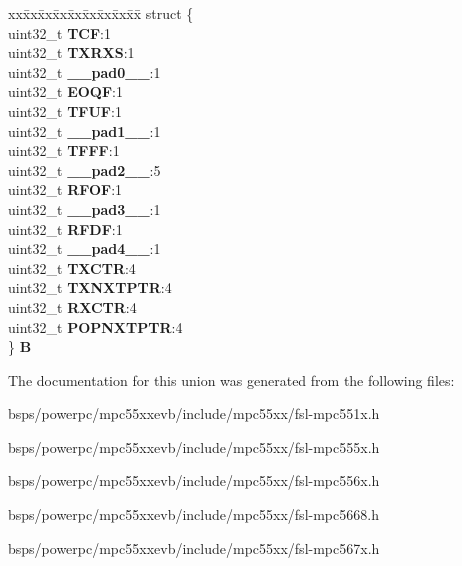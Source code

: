\begin{DoxyCompactItemize}
\begin{tabbing}
\end{tabbing}\item 
\mbox{\label{unionDSPI__tag_1_1DSPI__SR__tag_a37281b968030370262e6158b3253c53f}} 
\begin{tabbing}
xx\=xx\=xx\=xx\=xx\=xx\=xx\=xx\=xx\=\kill
struct \{\\
\>uint32\_t {\bfseries TCF}:1\\
\>uint32\_t {\bfseries TXRXS}:1\\
\>uint32\_t {\bfseries \_\_pad0\_\_}:1\\
\>uint32\_t {\bfseries EOQF}:1\\
\>uint32\_t {\bfseries TFUF}:1\\
\>uint32\_t {\bfseries \_\_pad1\_\_}:1\\
\>uint32\_t {\bfseries TFFF}:1\\
\>uint32\_t {\bfseries \_\_pad2\_\_}:5\\
\>uint32\_t {\bfseries RFOF}:1\\
\>uint32\_t {\bfseries \_\_pad3\_\_}:1\\
\>uint32\_t {\bfseries RFDF}:1\\
\>uint32\_t {\bfseries \_\_pad4\_\_}:1\\
\>uint32\_t {\bfseries TXCTR}:4\\
\>uint32\_t {\bfseries TXNXTPTR}:4\\
\>uint32\_t {\bfseries RXCTR}:4\\
\>uint32\_t {\bfseries POPNXTPTR}:4\\
\} {\bfseries B}\\

\end{tabbing}\end{DoxyCompactItemize}


The documentation for this union was generated from the following files\+:\begin{DoxyCompactItemize}
\item 
bsps/powerpc/mpc55xxevb/include/mpc55xx/fsl-\/mpc551x.\+h\item 
bsps/powerpc/mpc55xxevb/include/mpc55xx/fsl-\/mpc555x.\+h\item 
bsps/powerpc/mpc55xxevb/include/mpc55xx/fsl-\/mpc556x.\+h\item 
bsps/powerpc/mpc55xxevb/include/mpc55xx/fsl-\/mpc5668.\+h\item 
bsps/powerpc/mpc55xxevb/include/mpc55xx/fsl-\/mpc567x.\+h\end{DoxyCompactItemize}
